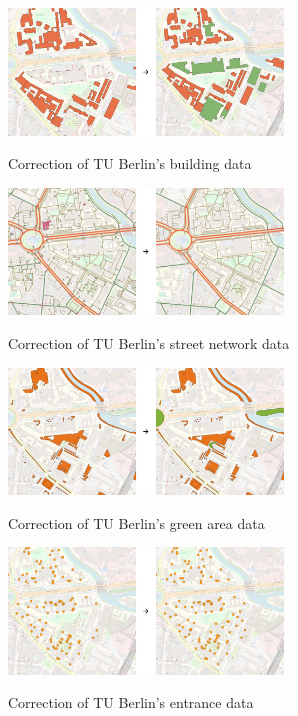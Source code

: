 \begin{figure}[H]
	\centering
	\includegraphics[width=0.65\textwidth]{images/preparing_buildings.png}\\
	\caption{Correction of TU Berlin's building data}
\end{figure}

\begin{figure}[H]
	\centering
	\includegraphics[width=0.65\textwidth]{images/preparing_streets.png}\\
	\caption{Correction of TU Berlin's street network data}
\end{figure}

\begin{figure}[H]
	\centering
	\includegraphics[width=0.65\textwidth]{images/preparing_green_areas.png}\\
	\caption{Correction of TU Berlin's green area data}
\end{figure}

\begin{figure}[H]
	\centering
	\includegraphics[width=0.65\textwidth]{images/preparing_entrances.png}\\
	\caption{Correction of TU Berlin's entrance data}
\end{figure}

